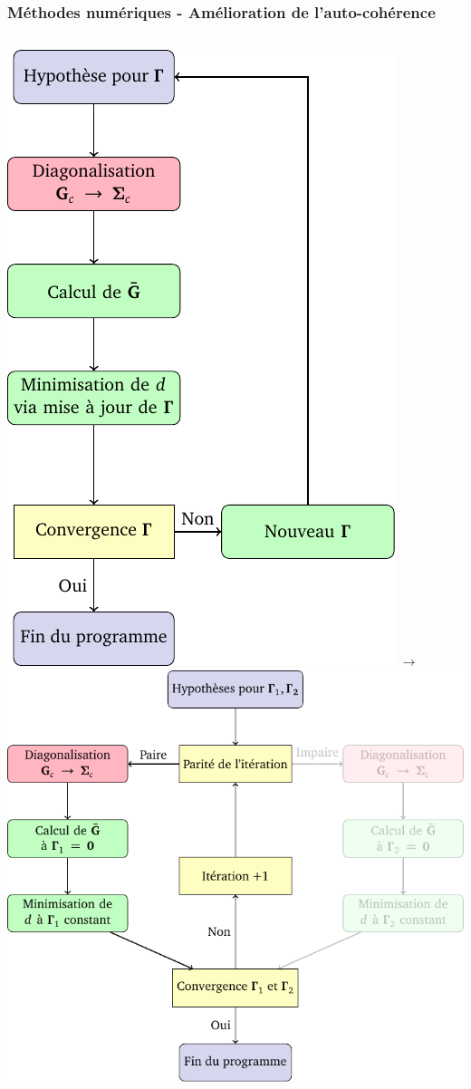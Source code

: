 \begin{frame}
    \frametitle{Méthodes numériques - Amélioration de l'auto-cohérence}
    \begin{columns}
        \includegraphics[scale=0.45]{./figures/theory/flow_chart.pdf}
        $\longrightarrow$
        \includegraphics[scale=0.45]{./figures/theory/flow_chart_virtual_pair.pdf}
    \end{columns}
\end{frame}

